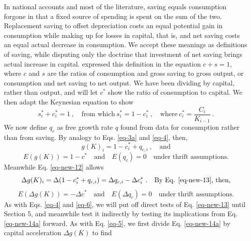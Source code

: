 In national accounts and most of the literature, saving equals consumption forgone in that a fixed source of spending is spent on the sum of the two. Replacement saving to offset depreciation costs an equal potential gain in consumption while making up for losses in capital, that is, and net saving costs an equal actual decrease in consumption. We accept these meanings as definitions of saving, while disputing only the doctrine that investment of net saving brings actual increase in capital. \cite{keynesGeneralTheoryEmployment1936} expressed this definition in the equation \(c + s = 1\), where \(c\) and \(s\) are the ratios of consumption and gross saving to gross output, or consumption and net saving to net output. We have been dividing by capital, rather than output, and will let \(c^*\) show the ratio of consumption to capital. We then adapt the Keynesian equation to show
\begin{equation*}
    s^*_i + c^*_i = 1\ , \quad \text{from which}\ s^*_i = 1 - c^*_i\ ,\quad \text{where}\ c^*_i = \frac{C_i}{K_{i-1}}\ .
\end{equation*}
%
We now define \(q_c\) as free growth rate \(q\) found from data for consumption rather than from saving. By analogy to Eqs. \eqref{eq-3a} and \eqref{eq-4}, then,
%
\begin{equation}
    g(K)_i = 1 - c_{i}^{*} + q_{c,i} \ , \quad \text{and} \label{eq-new-12}
\end{equation}
%
\vspace{-5ex}
%
\begin{equation}
    E(g(K)) = 1 - c^* \quad \text{and} \quad E(q_c) = 0 \quad \text{under thrift assumptions.} \label{eq-new-13}
\end{equation}
%
Meanwhile Eq. \eqref{eq-new-12} allows
\begin{equation}
    \Delta g(K)_i = \Delta ( 1 - c^*_i + q_{c,i} ) = \Delta q_{c,i} - \Delta c^*_i \ . \quad \text{By Eq. \eqref{eq-new-13}, then,} \label{eq-new-14a}
\end{equation}
%
\vspace{-5ex}
%
\begin{equation}
    E(\Delta g(K)) = -\Delta c^* \quad \text{and} \quad E(\Delta q_{c}) = 0 \quad \text{under thrift assumptions.} \label{eq-new-14}
\end{equation}
%
As with Eqs. \eqref{eq-4} and \eqref{eq-6}, we will put off direct tests of Eq. \eqref{eq-new-13} until Section 5, and meanwhile test it indirectly by testing its implications from Eq. \eqref{eq-new-14a} forward. As with Eq. \eqref{eq-5}, we first divide Eq. \eqref{eq-new-14a} by capital acceleration \(\Delta g(K)\) to find
